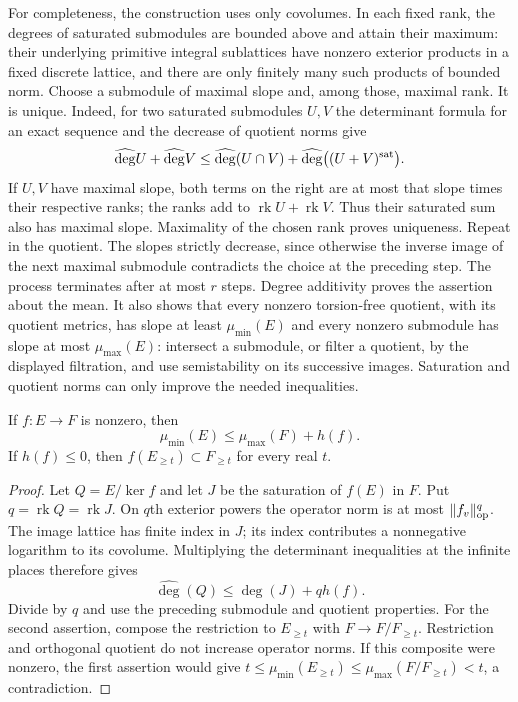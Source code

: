 For completeness, the construction uses only covolumes. In each fixed
rank, the degrees of saturated submodules are bounded above and attain
their maximum: their underlying primitive integral sublattices have
nonzero exterior products in a fixed discrete lattice, and there are
only finitely many such products of bounded norm. Choose a submodule
of maximal slope and, among those, maximal rank. It is unique. Indeed,
for two saturated submodules $U,V$ the determinant formula for an exact
sequence and the decrease of quotient norms give
\[
 \widehat{\deg}U+\widehat{\deg}V
 \le\widehat{\deg}(U\cap V)
       +\widehat{\deg}\bigl((U+V)^{\rm sat}\bigr).
\]
If $U,V$ have maximal slope, both terms on the right are at most that
slope times their respective ranks; the ranks add to
$\operatorname{rk}U+\operatorname{rk}V$. Thus their saturated sum also has
maximal slope. Maximality of the chosen rank proves uniqueness.
Repeat in the quotient. The slopes strictly decrease, since otherwise
the inverse image of the next maximal submodule contradicts the choice
at the preceding step. The process terminates after at most $r$ steps.
Degree additivity proves the assertion about the mean. It also shows
that every nonzero torsion-free quotient, with its quotient metrics,
has slope at least $\mu_{\min}(E)$ and every
nonzero submodule has slope at most $\mu_{\max}(E)$: intersect a submodule,
or filter a quotient, by the displayed filtration, and use semistability
on its successive images. Saturation and quotient norms can only improve
the needed inequalities.

\begin{lemma}\label{cs-functoriality}
If $f:E\to F$ is nonzero, then
\[
 \mu_{\min}(E)\le\mu_{\max}(F)+h(f).
\]
If $h(f)\le0$, then $f(E_{\ge t})\subset F_{\ge t}$ for every real $t$.
\end{lemma}
\begin{proof}
Let $Q=E/\ker f$ and let $J$ be the saturation of $f(E)$ in $F$.
Put $q=\operatorname{rk}Q=\operatorname{rk}J$. On $q$th exterior powers
the operator norm is at most $\|f_v\|_{\rm op}^{q}$.
The image lattice has finite index in $J$; its index contributes a
nonnegative logarithm to its covolume. Multiplying the determinant
inequalities at the infinite places therefore gives
\[
 \widehat{\deg}(Q)\le\widehat{\deg}(J)+q h(f).
\]
Divide by $q$ and use the preceding submodule and quotient properties.
For the second assertion, compose the restriction to $E_{\ge t}$ with
$F\to F/F_{\ge t}$. Restriction and orthogonal quotient do not increase
operator norms. If this composite were nonzero, the first assertion
would give $t\le\mu_{\min}(E_{\ge t})
\le\mu_{\max}(F/F_{\ge t})<t$, a contradiction.
\end{proof}

